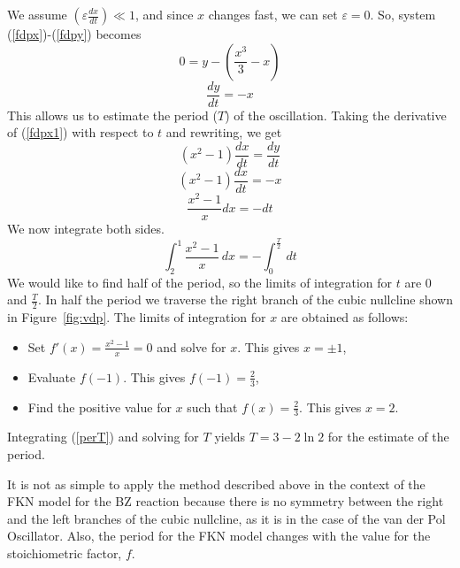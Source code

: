 \documentclass[]{article}
\numberwithin{equation}{section}		%
\begin{document}
We assume $\left( \varepsilon\frac{dx}{dt}\right) \ll 1$, and since $x$ changes fast, we can set $\varepsilon=0$. So, system (\ref{fdpx})-(\ref{fdpy}) becomes
\begin{equation}\label{fdpx1}
0=y-\left( \frac{x^3}{3}-x\right) 
\end{equation}
\begin{equation}\label{fdpy1}
\frac{dy}{dt}=-x
\end{equation}
This allows us to estimate the period ($T$) of the oscillation. 
Taking the derivative of (\ref{fdpx1}) with respect to $t$ and rewriting, we get
$$(x^2-1)\frac{dx}{dt}=\frac{dy}{dt}$$
$$(x^2-1)\frac{dx}{dt}=-x$$
$$\frac{x^2-1}{x}dx=-dt$$
We now integrate both sides. 
\begin{equation}\label{perT}
\int_2^{1} \frac{x^2-1}{x} \,dx = -\int_0^{\frac{T}{2}}\,dt 
\end{equation}
We would like to find half of the period, so the limits of integration for $t$ are 0 and $\frac{T}{2}$. In half the period we traverse the right branch of the cubic nullcline shown in Figure~\ref{fig:vdp}. The limits of integration for $x$ are obtained as follows:
\begin{itemize}
\item Set $f'(x)=\frac{x^2-1}{x}=0$ and solve for $x$. This gives $x=\pm1$,
\item Evaluate $f(-1)$. This gives $f(-1)=\frac{2}{3}$, 
\item Find the positive value for $x$ such that $f(x)=\frac{2}{3}$. This gives $x=2$.
\end{itemize}

Integrating (\ref{perT}) and solving for $T$ yields $T=3-2\ln 2$ for the estimate of the period.

It is not as simple to apply the method described above in the context of the FKN model for the BZ reaction because there is no symmetry between the right and the left branches of the cubic nullcline, as it is in the case of the van der Pol Oscillator. Also, the period for the FKN model changes with the value for the stoichiometric factor, $f$.
\end{document}
